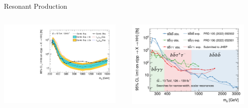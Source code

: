 \documentclass[11pt, xcolor={dvipsnames}, aspectratio=169]{beamer}
\begin{document}
\begin{frame}{Resonant \allbold{\HH} Production}

  \begin{columns}
    \includegraphics[width=0.95\textwidth]{results_res/resonant_upper_limits}

    \includegraphics[width=0.95\textwidth]{discussion/atlas_comparison_resonant_marked}
  \end{columns}
\end{frame}

\end{document}
